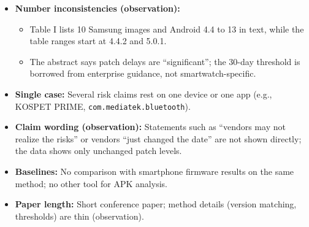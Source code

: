\documentclass[11pt,a4paper]{article}
\begin{document}
\begin{enumerate}
\begin{itemize}[leftmargin=*,itemsep=1pt,topsep=2pt]
        \begin{itemize}[itemsep=0pt]
            \item The ``1,684'' total is not broken down by feature in the text; Table II shows ratios per vendor, and a sum cannot be checked from it.
            \item Delay ``average 425 days'' covers only images with delay over 30 days; the average over all 176 is not given.
            \item Percent mismatch types use 343 changes, while ``22 out of 620 permissions'' is an average; link between the two is unclear.
            \item Table II device node row uses a different unit (images ratio) than other rows (configuration ratio).
        \end{itemize}
        \item \textbf{Number inconsistencies (observation):}
        \begin{itemize}[itemsep=0pt]
            \item Table I lists 10 Samsung images and Android 4.4 to 13 in text, while the table ranges start at 4.4.2 and 5.0.1.
            \item The abstract says patch delays are ``significant''; the 30-day threshold is borrowed from enterprise guidance, not smartwatch-specific.
        \end{itemize}
        \item \textbf{Single case:} Several risk claims rest on one device or one app (e.g., KOSPET PRIME, \texttt{com.mediatek.bluetooth}).
        \item \textbf{Claim wording (observation):} Statements such as ``vendors may not realize the risks'' or vendors ``just changed the date'' are not shown directly; the data shows only unchanged patch levels.
        \item \textbf{Baselines:} No comparison with smartphone firmware results on the same method; no other tool for APK analysis.
        \item \textbf{Paper length:} Short conference paper; method details (version matching, thresholds) are thin (observation).
    \end{itemize}


\end{enumerate}
\end{document}
